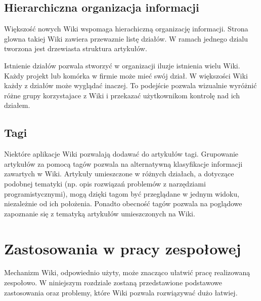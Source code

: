 \documentclass{article}
\begin{document}
\subsection{Hierarchiczna organizacja informacji}
Większość nowych Wiki wspomaga hierachiczną organizację informacji. Strona glowna takiej Wiki zawiera przewaznie listę działów. W ramach jednego dzialu tworzona jest drzewiasta struktura artykułów.  

	Istnienie działów pozwala stworzyć w organizacji iluzje istnienia wielu Wiki. Każdy projekt lub komórka w firmie może mieć swój dział. W większości Wiki każdy z działów może wyglądać inaczej. To podejście pozwala wizualnie wyróżnić różne grupy korzystajace z Wiki i przekazać użytkownikom kontrolę nad ich działem.




\subsection{Tagi}

	Niektóre aplikacje Wiki pozwalają dodawać do artykułów tagi. Grupowanie artykułów za pomocą tagów pozwala    na alternatywną klasyfikacje informacji zawartych w Wiki. Artykuły umieszczone w różnych działach, a dotyczące podobnej tematyki (np. opis rozwiązań problemów z narzędziami programistycznymi), mogą dzięki tagom być   przeglądane  w jednym widoku, niezależnie od ich położenia.
Ponadto obecność tagów pozwala na poglądowe zapoznanie się z tematyką artykułów umieszczonych na Wiki.



	
	

\newpage
\section{Zastosowania w pracy zespołowej}
Mechanizm Wiki, odpowiednio użyty, może znacząco ułatwić pracę realizowaną zespołowo. W niniejszym rozdziale zostaną przedstawione podstawowe zastosowania oraz problemy, które Wiki pozwala rozwiązywać dużo łatwiej. 
\end{document}
